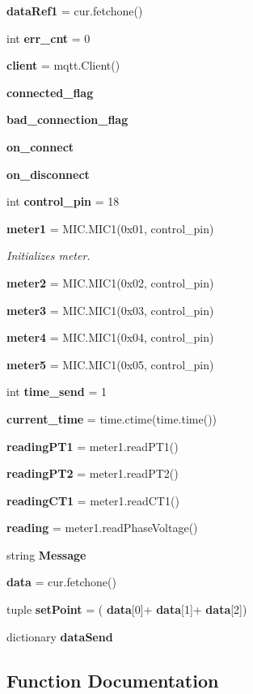 \begin{DoxyCompactItemize}
\item 
\textbf{ data\+Ref1} = cur.\+fetchone()
\item 
int \textbf{ err\+\_\+cnt} = 0
\item 
\textbf{ client} = mqtt.\+Client()
\item 
\textbf{ connected\+\_\+flag}
\item 
\textbf{ bad\+\_\+connection\+\_\+flag}
\item 
\textbf{ on\+\_\+connect}
\item 
\textbf{ on\+\_\+disconnect}
\item 
int \textbf{ control\+\_\+pin} = 18
\item 
\textbf{ meter1} = M\+I\+C.\+M\+I\+C1(0x01, control\+\_\+pin)
\begin{DoxyCompactList}\small\item\em Initializes meter. \end{DoxyCompactList}\item 
\textbf{ meter2} = M\+I\+C.\+M\+I\+C1(0x02, control\+\_\+pin)
\item 
\textbf{ meter3} = M\+I\+C.\+M\+I\+C1(0x03, control\+\_\+pin)
\item 
\textbf{ meter4} = M\+I\+C.\+M\+I\+C1(0x04, control\+\_\+pin)
\item 
\textbf{ meter5} = M\+I\+C.\+M\+I\+C1(0x05, control\+\_\+pin)
\item 
int \textbf{ time\+\_\+send} = 1
\item 
\textbf{ current\+\_\+time} = time.\+ctime(time.\+time())
\item 
\textbf{ reading\+P\+T1} = meter1.\+read\+P\+T1()
\item 
\textbf{ reading\+P\+T2} = meter1.\+read\+P\+T2()
\item 
\textbf{ reading\+C\+T1} = meter1.\+read\+C\+T1()
\item 
\textbf{ reading} = meter1.\+read\+Phase\+Voltage()
\item 
string \textbf{ Message}
\item 
\textbf{ data} = cur.\+fetchone()
\item 
tuple \textbf{ set\+Point} = (\textbf{ data}[0]+\textbf{ data}[1]+\textbf{ data}[2])
\item 
dictionary \textbf{ data\+Send}
\end{DoxyCompactItemize}


\subsection{Function Documentation}
\mbox{\label{namespacemain3_a5c75165294c699dccf20a3a5105d1c83}} 
